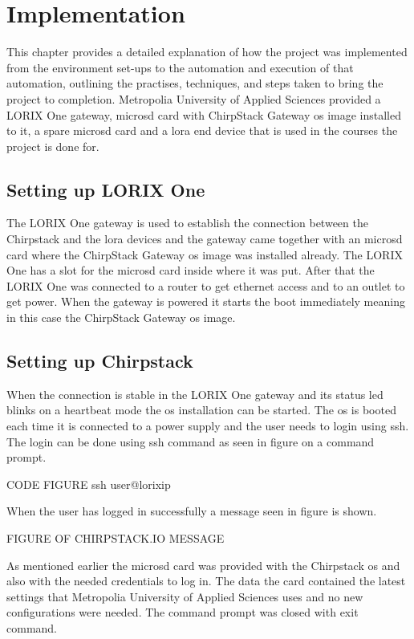
\chapter{Implementation} \label{ch:impl}
This chapter provides a detailed explanation of how the project was implemented from the environment set-ups to the automation and execution of that automation, outlining the practises, techniques, and steps taken to bring the project to completion.
Metropolia University of Applied Sciences provided a LORIX One gateway, micro\gls{sd} card with ChirpStack Gateway \gls{os} image installed to it, a spare micro\gls{sd} card and a \gls{lora} end device that is used in the courses the project is done for.

\section{Setting up LORIX One}
The LORIX One gateway is used to establish the connection between the Chirpstack and the \gls{lora} devices and the gateway came together with an micro\gls{sd} card where the ChirpStack Gateway \gls{os} image was installed already.
The LORIX One has a slot for the micro\gls{sd} card inside where it was put.
After that the LORIX One was connected to a router to get ethernet access and to an outlet to get power.
When the gateway is powered it starts the boot immediately meaning in this case the ChirpStack Gateway \gls{os} image.

\section{Setting up Chirpstack}
When the connection is stable in the LORIX One gateway and its status led blinks on a heartbeat mode the \gls{os} installation can be started.
The \gls{os} is booted each time it is connected to a power supply and the user needs to login using \gls{ssh}.
The login can be done using ssh command as seen in figure on a command prompt.

CODE FIGURE ssh user@lorixip

When the user has logged in successfully a message seen in figure is shown.

FIGURE OF CHIRPSTACK.IO MESSAGE

As mentioned earlier the micro\gls{sd} card was provided with the Chirpstack \gls{os} and also with the needed credentials to log in.
The data the card contained the latest settings that Metropolia University of Applied Sciences uses and no new configurations were needed.
The command prompt was closed with exit command.




